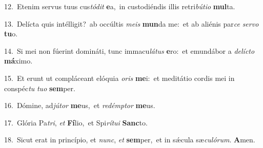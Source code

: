 {\numbfont\textcolor{\numbcolor}{12.}}~Etenim servus tuus cus\-\textit{tó}\-\textit{dit} \textbf{e}\-a,~\star in custodiéndis illis retri\-\textit{bú}\-\textit{ti}\textit{o} \textbf{mul}\-ta.\par
{\numbfont\textcolor{\numbcolor}{13.}}~Delícta quis intélligit?~\dagger ab occúltis \textit{me}\-\textit{is} \textbf{mun}\-da me:~\star et ab aliénis par\textit{ce} \textit{ser}\-\textit{vo} \textbf{tu}\-o.\par
{\numbfont\textcolor{\numbcolor}{14.}}~Si mei non fúerint domináti, tunc immacu\-\textit{lá}\-\textit{tus} \textbf{e}\-ro:~\star et emundábor a \textit{de}\-\textit{líc}\textit{to} \textbf{má}\-ximo.\par
{\numbfont\textcolor{\numbcolor}{15.}}~Et erunt ut compláceant elóquia \textit{o}\-\textit{ris} \textbf{me}\-i:~\star et meditátio cordis mei in conspéc\textit{tu} \textit{tu}\-\textit{o} \textbf{sem}\-per.\par
{\numbfont\textcolor{\numbcolor}{16.}}~Dómine, ad\-\textit{jú}\-\textit{tor} \textbf{me}\-us,~\star et \textit{red}\-\textit{émp}\textit{tor} \textbf{me}\-us.\par
{\numbfont\textcolor{\numbcolor}{17.}}~Glória Pa\-\textit{tri}\-, \textit{et} \textbf{Fí}\-lio,~\star et Spi\-\textit{rí}\-\textit{tu}\textit{i} \textbf{Sanc}\-to.\par
{\numbfont\textcolor{\numbcolor}{18.}}~Sicut erat in princípio, et \textit{nunc}\-, \textit{et} \textbf{sem}\-per,~\star et in sǽcula sæ\-\textit{cu}\-\textit{ló}\textit{rum}. \textbf{A}\-men.\par
